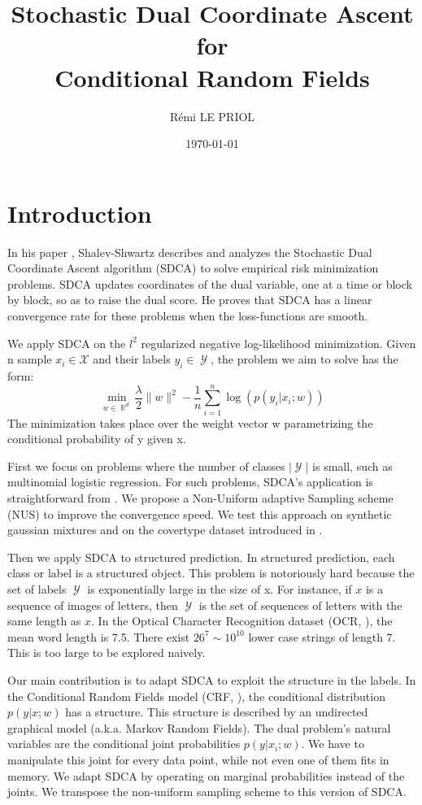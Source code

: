 \documentclass{article}
\title{Stochastic Dual Coordinate Ascent \\ for \\ Conditional Random Fields}
\author{R\'emi LE PRIOL}
\affil{Montreal Institute of Learning Algorithms}
\date{\today}
\DeclareMathOperator{\R}{\mathbb{R}}
\DeclareMathOperator{\1}{\mathbb{1}}
\DeclareMathOperator{\Y}{\mathcal{Y}}
\begin{document}
\maketitle

\section*{Introduction}
In his paper \cite{shalev-shwartz_accelerated_2013-1}, Shalev-Shwartz describes and analyzes the Stochastic Dual Coordinate Ascent algorithm (SDCA) to solve empirical risk minimization problems.
SDCA updates coordinates of the dual variable, one at a time or block by block, so as to raise the dual score.
He proves that SDCA has a linear convergence rate for these problems when the loss-functions are smooth.

We apply SDCA on the $l^2$ regularized negative log-likelihood minimization.
Given n sample $x_i \in \mathcal X$ and their labels $y_i \in \Y$, the problem we aim to solve has the form:
\begin{equation}
	\label{max likelihood}
	 \min_{w \in \R^d} \frac{\lambda}{2}\|w\|^2 - \frac{1}{n}   \sum_{i=1}^{n} \log(p(y_i|x_i; w))
\end{equation}
The minimization takes place over the weight vector w parametrizing the conditional probability of y given x. 
  
First we focus on problems where the number of classes $|\Y|$ is small, such as multinomial logistic regression.
For such problems, SDCA's application is straightforward from \cite{shalev-shwartz_accelerated_2013-1}.
We propose a Non-Uniform adaptive Sampling scheme (NUS) to improve the convergence speed.
We test this approach on synthetic gaussian mixtures and on the covertype dataset introduced in \cite{blackard_comparative_1999}.
 
Then we apply SDCA to structured prediction.
In structured prediction, each class or label is a structured object.
This problem is notoriously hard because the set of labels $\Y$ is exponentially large in the size of x.
For instance, if $x$ is a sequence of images of letters, then $\Y$ is the set of sequences of  letters with the same length as $x$.
In the Optical Character Recognition dataset (OCR, \cite{taskar_max-margin_2004}), the mean word length is 7.5.
There exist $26^7 \sim 10^{10}$ lower case strings of length 7.
This is too large to be explored naively.

Our main contribution is to adapt SDCA to exploit the structure in the labels.
In the Conditional Random Fields model (CRF, \cite{lafferty_conditional_2001} ), the conditional distribution $p(y|x ; w)$ has a structure.
This structure is described by an undirected graphical model (a.k.a. Markov Random Fields). 
The dual problem's natural variables are the conditional joint probabilities $p(y|x_i ; w)$.
We have to manipulate this joint for every data point, while not even one of them fits in memory.
We adapt SDCA by operating on marginal probabilities instead of the joints.
We transpose the non-uniform sampling scheme to this version of SDCA.
\end{document}
